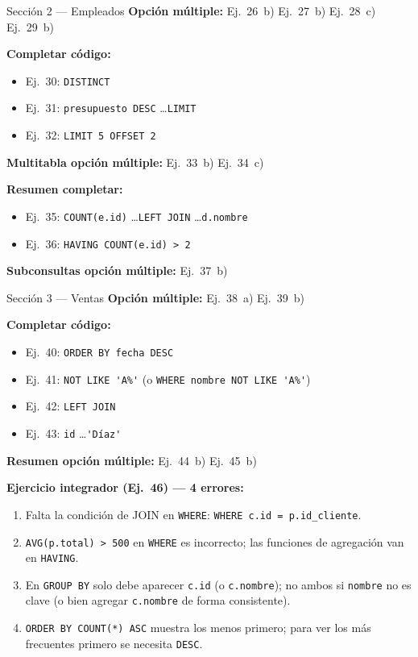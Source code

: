 \documentclass[12pt, a4paper]{article}
\begin{document}
\begin{solucionbox}{Sección 2 — Empleados}
\textbf{Opción múltiple:}
Ej.~26~b) \quad Ej.~27~b) \quad Ej.~28~c) \quad Ej.~29~b)

\medskip
\textbf{Completar código:}
\begin{itemize}[leftmargin=1em, itemsep=3pt]
  \item Ej.~30: \lstinline|DISTINCT|
  \item Ej.~31: \lstinline|presupuesto DESC| \ldots \lstinline|LIMIT|
  \item Ej.~32: \lstinline|LIMIT 5 OFFSET 2|
\end{itemize}

\medskip
\textbf{Multitabla opción múltiple:}
Ej.~33~b) \quad Ej.~34~c)

\medskip
\textbf{Resumen completar:}
\begin{itemize}[leftmargin=1em, itemsep=3pt]
  \item Ej.~35: \lstinline|COUNT(e.id)| \ldots \lstinline|LEFT JOIN| \ldots \lstinline|d.nombre|
  \item Ej.~36: \lstinline|HAVING COUNT(e.id) > 2|
\end{itemize}

\medskip
\textbf{Subconsultas opción múltiple:}
Ej.~37~b)
\end{solucionbox}

\begin{solucionbox}{Sección 3 — Ventas}
\textbf{Opción múltiple:}
Ej.~38~a) \quad Ej.~39~b)

\medskip
\textbf{Completar código:}
\begin{itemize}[leftmargin=1em, itemsep=3pt]
  \item Ej.~40: \lstinline|ORDER BY fecha DESC|
  \item Ej.~41: \lstinline|NOT LIKE 'A%'| (o \lstinline|WHERE nombre NOT LIKE 'A%'|)
  \item Ej.~42: \lstinline|LEFT JOIN|
  \item Ej.~43: \lstinline|id| \ldots \lstinline|'Díaz'|
\end{itemize}

\medskip
\textbf{Resumen opción múltiple:}
Ej.~44~b) \quad Ej.~45~b)

\medskip
\textbf{Ejercicio integrador (Ej.~46) — 4 errores:}
\begin{enumerate}[leftmargin=1.5em]
  \item Falta la condición de JOIN en \texttt{WHERE}:
        \lstinline|WHERE c.id = p.id_cliente|.
  \item \texttt{AVG(p.total) > 500} en \texttt{WHERE} es incorrecto;
        las funciones de agregación van en \texttt{HAVING}.
  \item En \texttt{GROUP BY} solo debe aparecer \texttt{c.id}
        (o \texttt{c.nombre}); no ambos si \texttt{nombre} no es
        clave (o bien agregar \texttt{c.nombre} de forma consistente).
  \item \texttt{ORDER BY COUNT(*) ASC} muestra los menos primero;
        para ver los más frecuentes primero se necesita \texttt{DESC}.
\end{enumerate}
\end{solucionbox}
\end{document}
